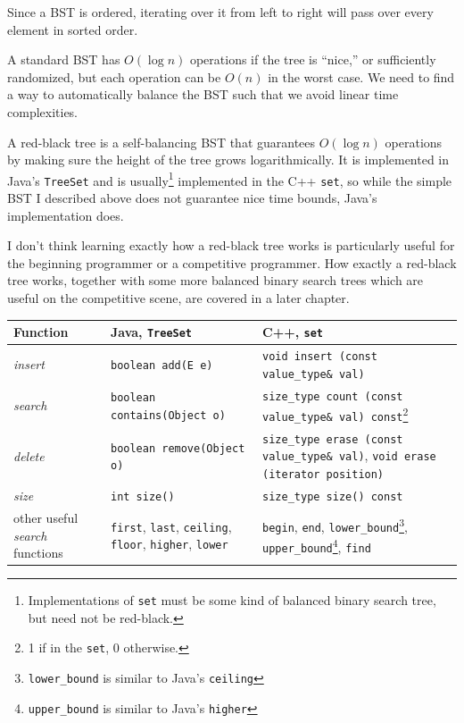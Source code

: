 Since a BST is ordered, iterating over it from left to right will pass over every element in sorted order.

A standard BST has $O(\log{n})$ operations if the tree is ``nice,'' or sufficiently randomized, but each operation can be $O(n)$ in the worst case. We need to find a way to automatically balance the BST such that we avoid linear time complexities.

A red-black tree is a self-balancing BST that guarantees $O(\log{n})$ operations by making sure the height of the tree grows logarithmically. It is implemented in Java's \texttt{TreeSet} and is usually\footnote{Implementations of \texttt{set} must be some kind of balanced binary search tree, but need not be red-black.} implemented in the C++ \texttt{set}, so while the simple BST I described above does not guarantee nice time bounds, Java's implementation does.

I don't think learning exactly how a red-black tree works is particularly useful for the beginning programmer or a competitive programmer. How exactly a red-black tree works, together with some more balanced binary search trees which are useful on the competitive scene, are covered in a later chapter.

\begin{center}
    \begin{tabular}{ | p{5cm} | p{5cm} | p{5cm} | }
      \hline
      \textbf{Function}	&	\textbf{Java, \texttt{TreeSet}}	&	\textbf{C++, \texttt{set}} \\ \hline
      \textit{insert}		&	\texttt{boolean add(E e)}	&	\texttt{void insert (const value\_type\& val)} \\ \hline
      \textit{search}		&	\texttt{boolean contains(Object o)}	&	\texttt{size\_type count (const value\_type\& val) const}\footnote{1 if in the \texttt{set}, 0 otherwise.}	\\ \hline
      \textit{delete}		&	\texttt{boolean	remove(Object o)}		&	\texttt{size\_type erase (const value\_type\& val)}, \texttt{void erase (iterator position)} \\ \hline
      \textit{size} & \texttt{int size()} & \texttt{size\_type size() const} \\ \hline
      other useful \textit{search} functions	& \texttt{first}, \texttt{last}, \texttt{ceiling}, \texttt{floor}, \texttt{higher}, \texttt{lower} & \texttt{begin}, \texttt{end}, \texttt{lower\_bound}\footnote{\texttt{lower\_bound} is similar to Java's \texttt{ceiling}}, \texttt{upper\_bound}\footnote{\texttt{upper\_bound} is similar to Java's \texttt{higher}}, \texttt{find} \\ \hline
    \end{tabular}
  \end{center}

